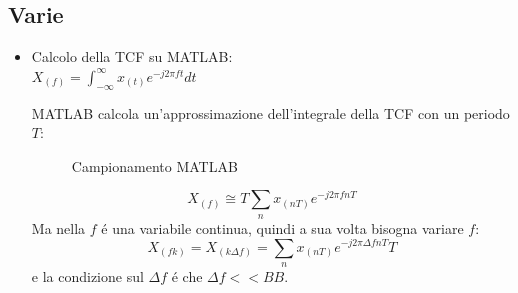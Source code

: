     \subsection{Varie}\label{Varie}
        \begin{itemize}
            \item {
                Calcolo della TCF su MATLAB:\\
                $X_{(f)} = \int_{-\infty}^{\infty} x_{(t)} e^{-j2\pi ft } dt$

                MATLAB calcola un'approssimazione dell'integrale della TCF con un periodo $T$:
                \begin{figure}[H]
                    \centering
                    \caption{Campionamento MATLAB}
                    \label{fig:campionamento MATLAB xt}
                \end{figure}    
                \[
                    X_{(f)} \cong  T\sum_{n} x_{(nT)}e^{-j2\pi fnT}
                \]
                Ma nella $f$ é una variabile continua, quindi a sua volta bisogna variare $f$:\\
                \[X_{(fk)} =X_{(k\Delta f)} = \sum_{n} x_{(nT)}e^{-j2\pi \Delta fnT}T\]
                e la condizione sul $\Delta f$ é che $\Delta f<<BB$.
                \begin{figure}[H]
                    \centering
                    \begin{tikzpicture}

\end{tikzpicture}
\end{figure}}
\end{itemize}

